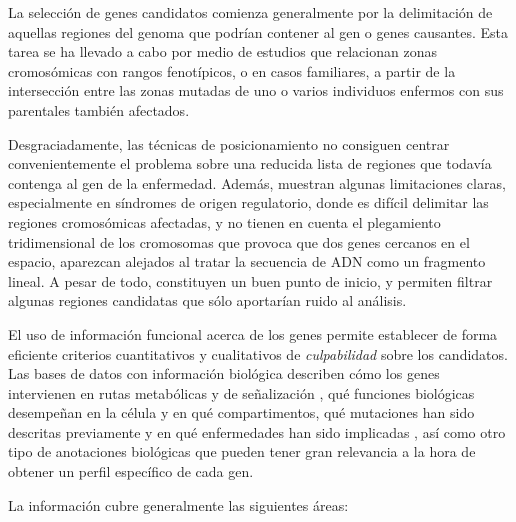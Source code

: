 \medskip
La selección de genes candidatos comienza generalmente por la delimitación de aquellas regiones del genoma que podrían contener al gen o genes causantes. Esta tarea se ha llevado a cabo por medio de estudios que relacionan zonas cromosómicas con rangos fenotípicos, o en casos familiares, a partir de la intersección entre las zonas mutadas de uno o varios individuos enfermos con sus parentales también afectados.

\medskip
Desgraciadamente, las técnicas de posicionamiento no consiguen centrar convenientemente el problema sobre una reducida lista de regiones que todavía contenga al gen de la enfermedad. Además, muestran algunas limitaciones claras, especialmente en síndromes de origen regulatorio, donde es difícil delimitar las regiones cromosómicas afectadas, y no tienen en cuenta el plegamiento tridimensional de los cromosomas que provoca que dos genes cercanos en el espacio, aparezcan alejados al tratar la secuencia de ADN como un fragmento lineal. A pesar de todo, constituyen un buen punto de inicio, y permiten filtrar algunas regiones candidatas que sólo aportarían ruido al análisis.

\medskip
El uso de información funcional acerca de los genes permite establecer de forma eficiente criterios cuantitativos y cualitativos de \emph{culpabilidad} sobre los candidatos. Las bases de datos con información biológica describen cómo los genes intervienen en rutas metabólicas y de señalización \cite{kegg}, qué funciones biológicas desempeñan en la célula y en qué compartimentos\cite{go}, qué mutaciones han sido descritas previamente \cite{dbsnp} y en qué enfermedades han sido implicadas \cite{hgmd}, así como otro tipo de anotaciones biológicas que pueden tener gran relevancia a la hora de obtener un perfil específico de cada gen. 

\medskip
La información cubre generalmente las siguientes áreas:

